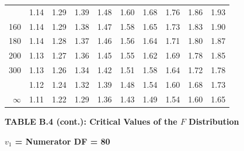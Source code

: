 \documentclass[10pt]{article}
\begin{document}
\begin{longtable}{@{}r!{\vrule width 0.8pt\hspace{0.55em}}rrrrrrrrr@{}}
 & 1.14 & 1.29 & 1.39 & 1.48 & 1.60 & 1.68 & 1.76 & 1.86 & 1.93 \\
160 & 1.14 & 1.29 & 1.38 & 1.47 & 1.58 & 1.65 & 1.73 & 1.83 & 1.90 \\
180 & 1.14 & 1.28 & 1.37 & 1.46 & 1.56 & 1.64 & 1.71 & 1.80 & 1.87 \\
200 & 1.13 & 1.27 & 1.36 & 1.45 & 1.55 & 1.62 & 1.69 & 1.78 & 1.85 \\
300 & 1.13 & 1.26 & 1.34 & 1.42 & 1.51 & 1.58 & 1.64 & 1.72 & 1.78 \\
 & 1.12 & 1.24 & 1.32 & 1.39 & 1.48 & 1.54 & 1.60 & 1.68 & 1.73 \\
$\infty$ & 1.11 & 1.22 & 1.29 & 1.36 & 1.43 & 1.49 & 1.54 & 1.60 & 1.65 \\
\end{longtable}
\newpage
\thispagestyle{empty}
\begin{center}
{\large\bfseries TABLE B.4 (cont.): Critical Values of the $F$ Distribution\par}
\end{center}
{\large\bfseries $v_1$ = Numerator DF = 80\par}
\vspace{0.5em}
\small
\end{document}
